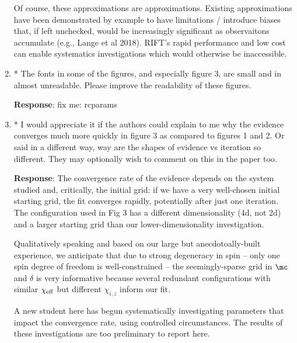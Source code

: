 \documentclass[onecolumn]{revtex4}
\newcommand\editremark[1]{{\color{red} #1}}
\begin{document}
\begin{enumerate}
Of course, these approximations are approximations.  Existing approximations  have been demonstrated by example to have limitations /
introduce biases that, if left unchecked, would be increasingly significant as observaitons accumulate (e.g., Lange et
al 2018).  RIFT's rapid performance  and low cost can enable systematics investigations which would otherwise be inaccessible.


\item * The fonts in some of the figures, and especially figure 3, are small
and in almost unreadable. Please improve the readability of these
figures.

\noindent \textbf{Response}:  \editremark{fix me: rcparams}


\item * I would appreciate it if the authors could explain to me why the
evidence converges much more quickly in figure 3 as compared to
figures 1 and 2. Or said in a different way, way are the shapes of
evidence vs iteration so different. They may optionally wish to
comment on this in the paper too.

\noindent \textbf{Response}:  The convergence rate of the evidence depends on the system studied and, critically, the
initial grid: if we have a very well-chosen initial starting grid, the fit  converges rapidly, potentially after just
one iteration.  The configuration used
in Fig 3 has a different dimensionality (4d, not 2d) and a larger starting  grid than our lower-dimensionality investigation.

Qualitatively speaking and based on our large but anecdotoally-built experience, we anticipate that  due to strong degeneracy in
spin -- only one spin degree of freedom is well-constrained -- the seemingly-sparse grid in $\mc$ and $\delta$ is very
informative because several redundant configurations with similar $\chi_{\rm eff}$ but different $\chi_{i,z}$ inform our
fit.   

A new  student here has begun systematically investigating parameters that impact the convergence rate, using controlled
circumstances. The results of these investigations are too preliminary to report here.

\end{enumerate}
\end{document}
